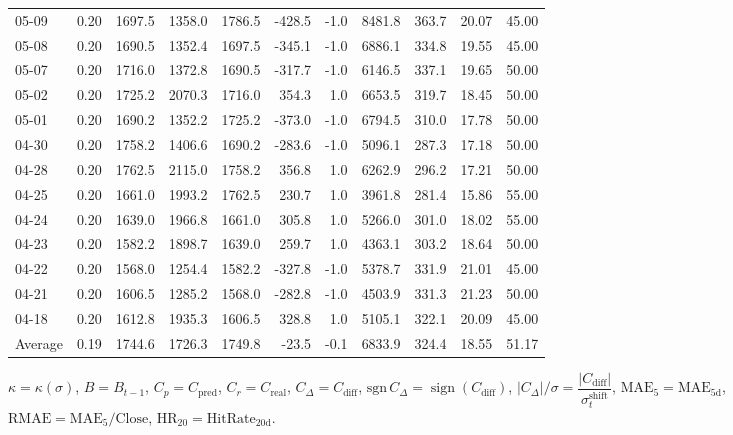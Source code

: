 \begin{threeparttable}
{\begin{tabular}{lrrrrrrrrrr}
05-09 & 0.20 & 1697.5 & 1358.0 & 1786.5 & -428.5 & -1.0 & 8481.8 & 363.7 & 20.07 & 45.00 \\
05-08 & 0.20 & 1690.5 & 1352.4 & 1697.5 & -345.1 & -1.0 & 6886.1 & 334.8 & 19.55 & 45.00 \\
05-07 & 0.20 & 1716.0 & 1372.8 & 1690.5 & -317.7 & -1.0 & 6146.5 & 337.1 & 19.65 & 50.00 \\
05-02 & 0.20 & 1725.2 & 2070.3 & 1716.0 & 354.3 & 1.0 & 6653.5 & 319.7 & 18.45 & 50.00 \\
05-01 & 0.20 & 1690.2 & 1352.2 & 1725.2 & -373.0 & -1.0 & 6794.5 & 310.0 & 17.78 & 50.00 \\
04-30 & 0.20 & 1758.2 & 1406.6 & 1690.2 & -283.6 & -1.0 & 5096.1 & 287.3 & 17.18 & 50.00 \\
04-28 & 0.20 & 1762.5 & 2115.0 & 1758.2 & 356.8 & 1.0 & 6262.9 & 296.2 & 17.21 & 50.00 \\
04-25 & 0.20 & 1661.0 & 1993.2 & 1762.5 & 230.7 & 1.0 & 3961.8 & 281.4 & 15.86 & 55.00 \\
04-24 & 0.20 & 1639.0 & 1966.8 & 1661.0 & 305.8 & 1.0 & 5266.0 & 301.0 & 18.02 & 55.00 \\
04-23 & 0.20 & 1582.2 & 1898.7 & 1639.0 & 259.7 & 1.0 & 4363.1 & 303.2 & 18.64 & 50.00 \\
04-22 & 0.20 & 1568.0 & 1254.4 & 1582.2 & -327.8 & -1.0 & 5378.7 & 331.9 & 21.01 & 45.00 \\
04-21 & 0.20 & 1606.5 & 1285.2 & 1568.0 & -282.8 & -1.0 & 4503.9 & 331.3 & 21.23 & 50.00 \\
04-18 & 0.20 & 1612.8 & 1935.3 & 1606.5 & 328.8 & 1.0 & 5105.1 & 322.1 & 20.09 & 45.00 \\
Average & 0.19 & 1744.6 & 1726.3 & 1749.8 & -23.5 & -0.1 & 6833.9 & 324.4 & 18.55 & 51.17 \\
\bottomrule
\end{tabular}
}%
\begin{tablenotes}\footnotesize
\item $\kappa=\kappa(\sigma)$, $B=B_{t-1}$, $C_p=C_{\text{pred}}$, $C_r=C_{\text{real}}$, $C_\Delta=C_{\text{diff}}$, $\mathrm{sgn}\,C_\Delta=\operatorname{sign}(C_{\text{diff}})$, $|C_\Delta|/\sigma=\dfrac{|C_{\text{diff}}|}{\sigma_t^{\text{shift}}}$, $\mathrm{MAE}_5=\mathrm{MAE}_{5\text{d}}$, $\mathrm{RMAE}= \mathrm{MAE}_5 / \text{Close}$, $\mathrm{HR}_{20}=\mathrm{HitRate}_{20\text{d}}$.
\end{tablenotes}
\end{threeparttable}
\endgroup